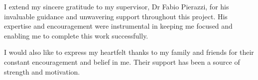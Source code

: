 I extend my sincere gratitude to my supervisor, Dr Fabio Pierazzi, for his invaluable guidance and unwavering support throughout this project. His expertise and encouragement were instrumental in keeping me focused and enabling me to complete this work successfully.

I would also like to express my heartfelt thanks to my family and friends for their constant encouragement and belief in me. Their support has been a source of strength and motivation.